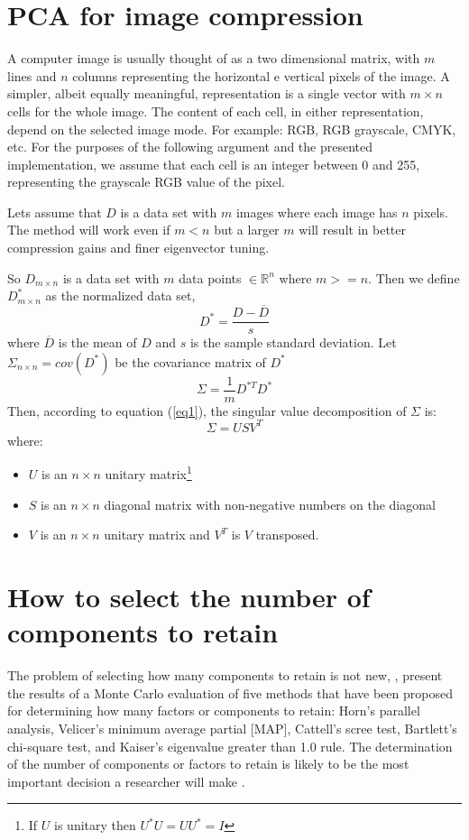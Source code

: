 \documentclass{article} %
\begin{document}
\section{PCA for image compression}
A computer image is usually thought of as a two dimensional matrix, with $m$ lines and $n$ columns representing the horizontal e vertical pixels of the image. A simpler, albeit equally meaningful, representation is a single vector with $m\times n$ cells for the whole image. The content of each cell, in either representation, depend on the selected image mode. For example: RGB, RGB grayscale, CMYK, etc. For the purposes of the following argument and the presented implementation, we assume that each cell is an integer between 0 and 255, representing the grayscale RGB value of the pixel.\par
Lets assume that $D$ is a data set with $m$ images where each image has $n$ pixels. The method will work even if $m<n$ but a larger $m$ will result in better compression gains and finer eigenvector tuning.\par
So $D_{m\times n}$ is a data set with $m$ data points $\in \mathbb{R}^n$ where $m >= n$. Then we define ${D}_{m\times n}^*$ as the normalized data set, \[D^* = \frac{D-\overline{D}}{s}\] 
where $\overline{D}$ is the mean of $D$ and $s$ is the sample standard deviation. Let $\Sigma_{n\times n} = cov(D^*)$ be the covariance matrix of $D^*$ \[\Sigma = \frac{1}{m}D^{*T}D^*\] Then, according to equation (\ref{eq1}), the singular value decomposition of $\Sigma$ is: \[\Sigma = US V^T\] where:
\begin{itemize}
\item $U$ is an $n\times n$ unitary matrix\footnote{If $U$ is unitary then $U^*U=UU^*=I$}
\item $S$ is an $n\times n$ diagonal matrix with non-negative numbers on the diagonal
\item $V$ is an $n\times n$ unitary matrix and $V^T$ is $V$ transposed.
\end{itemize}

\section{How to select the number of components to retain}
The problem of selecting how many components to retain is not new, \citet{zwick1986comparison}, present the results of a Monte Carlo evaluation of five methods that have been proposed for determining how many factors or components to retain: Horn's parallel analysis, Velicer's minimum average partial [MAP], Cattell's scree test, Bartlett's chi-square test, and Kaiser's eigenvalue greater than 1.0 rule. 
The determination of the number of components or factors to retain is likely to be the most important decision a researcher will make \citet{zwick1986comparison}.
\end{document}
